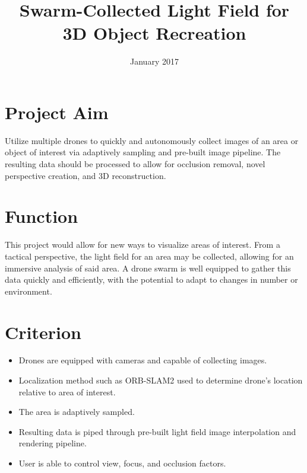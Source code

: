 \documentclass[12pt]{report}
\begin{document}
\title{Swarm-Collected Light Field for 3D Object Recreation  \vspace{2.5cm}}	%

\date{
	 January 2017
}

\maketitle
\section*{Project Aim}
Utilize multiple drones to quickly and autonomously collect images of an area or object of interest via adaptively sampling and pre-built image pipeline. The resulting data should be processed to allow for occlusion removal, novel perspective creation, and 3D reconstruction.
 
\section*{Function}
This project would allow for new ways to visualize areas of interest. From a tactical perspective, the light field for an area may be collected, allowing for an immersive analysis of said area. A drone swarm is well equipped to gather this data quickly and efficiently, with the potential to adapt to changes in number or environment. 

\section*{Criterion}
\begin{itemize}
\item Drones are equipped with cameras and capable of collecting images.
\item Localization method such as ORB-SLAM2 used to determine drone's location relative to area of interest.
\item The area is adaptively sampled.
\item Resulting data is piped through pre-built light field image interpolation and rendering pipeline. 
\item User is able to control view, focus, and occlusion factors.
\end{itemize}
\end{document}
